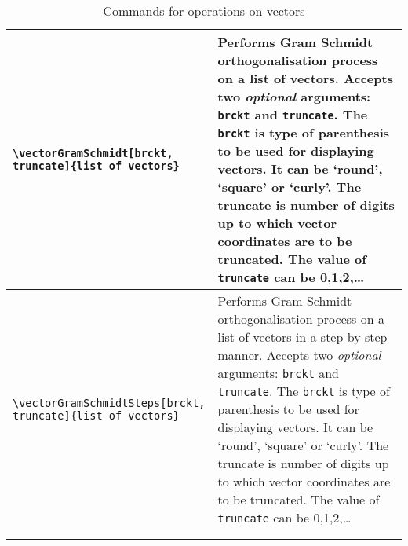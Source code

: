 \documentclass{article}
\begin{document}
\begin{longtable}{m{7cm}m{8.2cm}}
\midrule
\begin{lstlisting}
\vectorGramSchmidt[brckt,
truncate]{list of vectors}
\end{lstlisting} & Performs Gram Schmidt orthogonalisation process on a list of vectors.  Accepts two \emph{optional} arguments: \verb|brckt| and \verb|truncate|. The \verb|brckt| is type of parenthesis to be used for displaying vectors. It can be `round', `square' or `curly'. The truncate is number of digits  up to which vector coordinates are to be truncated. The value of \verb|truncate|  can be 0,1,2,\ldots\\
\midrule
\begin{lstlisting}
\vectorGramSchmidtSteps[brckt,
truncate]{list of vectors}
\end{lstlisting} & Performs Gram Schmidt orthogonalisation process on a list of vectors in a step-by-step manner.  Accepts two \emph{optional} arguments: \verb|brckt| and \verb|truncate|. The \verb|brckt| is type of parenthesis to be used for displaying vectors. It can be `round', `square' or `curly'. The truncate is number of digits  up to which vector coordinates are to be truncated. The value of \verb|truncate|  can be 0,1,2,\ldots\\
\bottomrule \\
\caption{Commands for operations on vectors}
\label{tbl:luavector}
\end{longtable}
\end{document}
